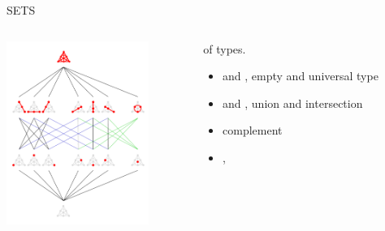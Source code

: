 \begin{frame}{SETS}
  \begin{columns}
    \begin{column}{0.4\textwidth}
      \includegraphics[height=6cm]{Fano_plane_Hasse_diagram} 
    \end{column}
    \begin{column}{0.6\textwidth}%
       of types.

      \medskip
      
  \begin{itemize}
  \item {} and , empty and universal type
  \item {} and , union and intersection
  \item {} complement
  \item \eg, 
  \end{itemize}
      
    \end{column}
  \end{columns}
  
\end{frame}

\newsavebox\adtbox
\begin{lrbox}{\adtbox}
  \begin{minipage}{11cm}
    
  \end{minipage}
\end{lrbox}






